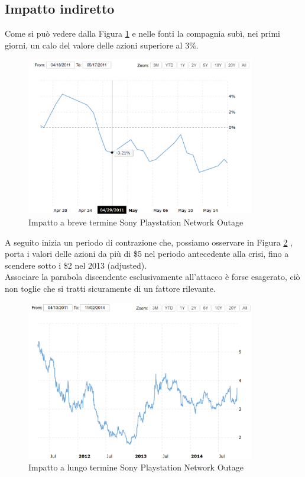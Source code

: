 \documentclass[12pt,a4paper,twoside]{report}
\begin{document}
\subsection{Impatto indiretto}
Come si pu\`o vedere dalla Figura \ref{fig:pnt1} \cite{macrotrends_sony} e nelle fonti \cite{Sony_pnt} la compagnia sub\`i, nei primi giorni, un calo del valore delle azioni  superiore al 3\%.\\

\begin{figure}[H] 
\begin{center} 
\includegraphics[width=10cm]{figures/sony_2011_shortTerm.png} 
\caption[Grafico Sony PSN short]{Impatto a breve termine Sony Playstation Network Outage}\label{fig:pnt1}
\end{center}
\end{figure}

A seguito inizia un periodo di contrazione che, possiamo osservare in Figura \ref{fig:pnt2} \cite{macrotrends_sony}, porta i valori delle azioni da pi\`u di \$5 nel periodo antecedente alla crisi, fino a scendere sotto i \$2 nel 2013 (adjusted). \\Associare la parabola discendente esclusivamente all'attacco \`e forse esagerato, ci\`o non toglie che si tratti sicuramente di un fattore rilevante.\\ 

\begin{figure}[H] 
\begin{center} 
\includegraphics[width=10cm]{figures/sony_2011_longTerm.png} 
\caption[Grafico Sony PSN long]{Impatto a lungo termine Sony Playstation Network Outage}\label{fig:pnt2}
\end{center}
\end{figure}
\end{document}
